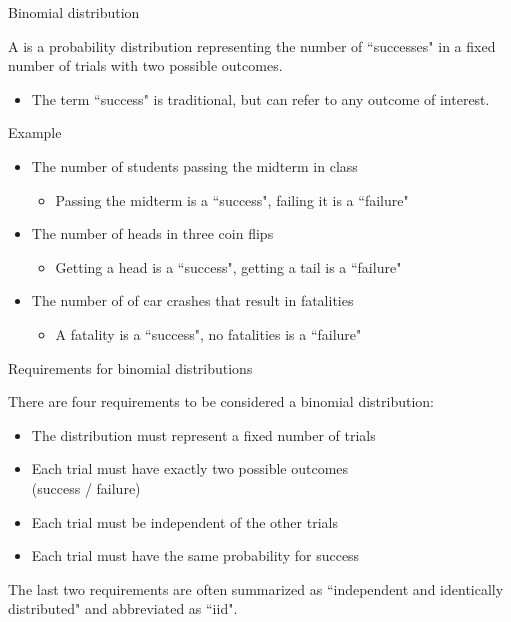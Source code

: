 \documentclass[xcolor=table, handout]{beamer}
\begin{document}
\begin{frame}{Binomial distribution}
\begin{block}{}
{\large A  is a probability distribution representing the number of ``successes" in a fixed number of trials with two possible outcomes. }
\begin{itemize}
\pause\item The term ``success" is traditional, but can refer to any outcome of interest.
\end{itemize}
\end{block}
\pause
\begin{exampleblock}{Example}
\begin{itemize}
\item The number of students passing the midterm in class
\begin{itemize}
\item Passing the midterm is a ``success", failing it is a ``failure"
\end{itemize}
\pause\item The number of heads in three coin flips
\begin{itemize}
\item Getting a head is a ``success", getting a tail is a ``failure"
\end{itemize}
\pause\item The number of of car crashes that result in fatalities
\begin{itemize}
\item A fatality is a ``success", no fatalities is a ``failure"
\end{itemize}

\end{itemize}
\end{exampleblock}
\end{frame}

\begin{frame}{Requirements for binomial distributions}
\begin{block}{}
There are four requirements to be considered a binomial distribution:
\begin{itemize}
\pause\item The distribution must represent a fixed number of trials
\pause\item Each trial must have exactly two possible outcomes\\(success / failure)
\pause\item Each trial must be independent of the other trials
\pause\item Each trial must have the same probability for success
\end{itemize}
\pause The last two requirements are often summarized as ``independent and identically distributed" and abbreviated as ``iid".
\end{block}
\end{frame}
\end{document}
